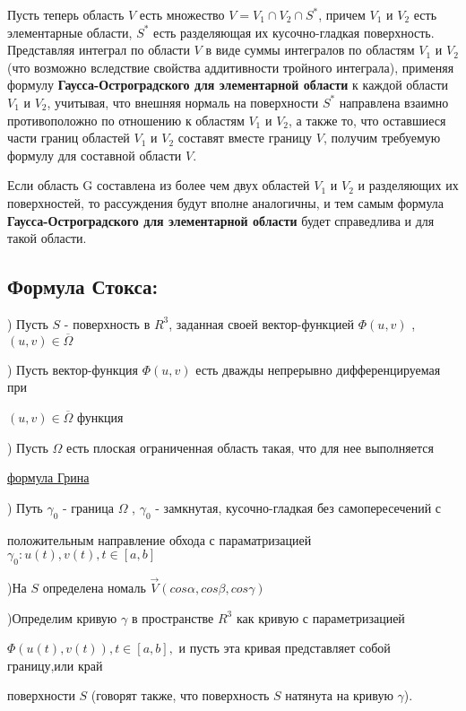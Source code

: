 \documentclass[12pt, english]{article}
\begin{document}
	Пусть теперь область $V$ есть множество $V = V_1 \cap V_2 \cap S^* $, причем $V_1$
и $V_2$ есть элементарные области, $S^* $ есть разделяющая их кусочно-гладкая
поверхность. Представляя интеграл по области $V$ в виде суммы интегралов по областям $V_1$ и $V_2$ (что возможно вследствие свойства аддитивности
тройного интеграла), применяя формулу \textbf{Гаусса-Остроградского для элементарной области} к каждой области $V_1$ и $V_2$,
учитывая, что внешняя нормаль на поверхности $S^* $ направлена взаимно
противоположно по отношению к областям $V_1$ и $V_2$, а также то, что оставшиеся части границ областей $V_1$ и $V_2$ составят вместе границу $V$, получим
требуемую формулу  для составной области $V$.

	Если область G составлена из более чем двух областей
$V_1$ и $V_2$ и разделяющих их поверхностей, то рассуждения будут вполне
аналогичны, и тем самым формула \textbf{Гаусса-Остроградского для элементарной области} будет справедлива и для такой
области.


\newpage
\subsection{Формула Стокса:}

) Пусть $S$ - поверхность в $R^3$, заданная своей вектор-функцией $\Phi(u,v)$ , $(u,v) \in \overline{\Omega}$

) Пусть вектор-функция $\Phi(u,v)$ есть дважды непрерывно дифференцируемая при \par $(u,v) \in \overline{\Omega}$ функция
	
) Пусть $\Omega$ есть плоская ограниченная область такая, что для нее выполняется \par \hyperref[eq3]{формула Грина}

) Путь $\gamma_0$ - граница $\Omega$ , $\gamma_0$ - замкнутая, кусочно-гладкая без самопересечений с \par положительным направление обхода с параматризацией  $\gamma_0 : u(t) , v(t) , t \in [a,b]$

)На $S$ определена номаль $\vec{V}(cos\alpha , cos\beta , cos\gamma)$

)Определим кривую $\gamma$ в пространстве $R^3$ как кривую с параметризацией \par $\Phi(u(t) , v(t)) , t \in [a,b], $ и пусть эта кривая представляет собой границу,или край \par поверхности $S$ (говорят также, что поверхность $S$ натянута
на кривую $\gamma$).
\end{document}
